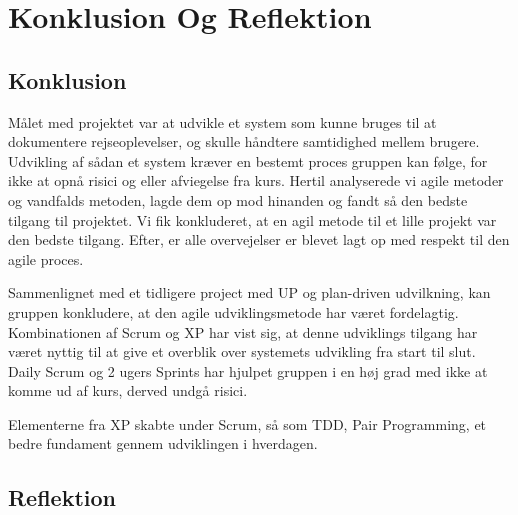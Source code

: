 \chapter{Konklusion Og Reflektion}\label{ch:KonklusionReflektion}

\section{Konklusion}
Målet med projektet var at udvikle et system som kunne bruges til at dokumentere rejseoplevelser, og skulle håndtere samtidighed mellem brugere. Udvikling af sådan et system kræver en bestemt proces gruppen kan følge, for ikke at opnå risici og eller afviegelse fra kurs. Hertil analyserede vi agile metoder og vandfalds metoden, lagde dem op mod hinanden og fandt så den bedste tilgang til projektet. Vi fik konkluderet, at en agil metode til et lille projekt var den bedste tilgang. Efter, er alle overvejelser er blevet lagt op med respekt til den agile proces. 

Sammenlignet med et tidligere project med UP og plan-driven udvilkning, kan gruppen konkludere, at den agile udviklingsmetode har været fordelagtig. Kombinationen af Scrum og XP har vist sig, at denne udviklings tilgang har været nyttig til at give et overblik over systemets udvikling fra start til slut. Daily Scrum og 2 ugers Sprints har hjulpet gruppen i en høj grad med ikke at komme ud af kurs, derved undgå risici. 

 




 Elementerne fra XP skabte under Scrum, så som TDD, Pair Programming, et bedre fundament gennem udviklingen i hverdagen. 
 
 


\section{Reflektion}
